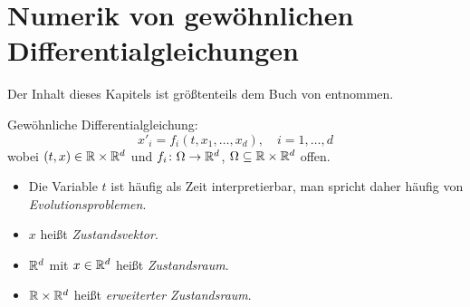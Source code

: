 \chapter{Numerik von gewöhnlichen Differentialgleichungen}

Der Inhalt dieses Kapitels ist größtenteils dem Buch von \cite{deuflhard_bornemann:2008} entnommen.


Gewöhnliche Differentialgleichung:
\begin{equation*}
 x'_i=f_i (t,x_1,\ldots,x_d ), \quad i=1,\ldots,d
\end{equation*}
wobei $(t,x) \in \mathbb R \times \mathbb R^d$ und $f_i \colon \Omega \to \mathbb R^d$, $\Omega \subseteq \mathbb R \times \mathbb R^d$ offen.

\begin{itemize}[nolistsep]
	\item Die Variable $t$ ist häufig als Zeit interpretierbar, man spricht daher häufig von \emph{Evolutionsproblemen}.
	\item $x$ heißt \emph{Zustandsvektor}.
	\item $\mathbb R^d$ mit $x \in \mathbb R^d$ heißt \emph{Zustandsraum}.
	\item $\mathbb R \times \mathbb R^d$ heißt \emph{erweiterter Zustandsraum}.
\end{itemize}


